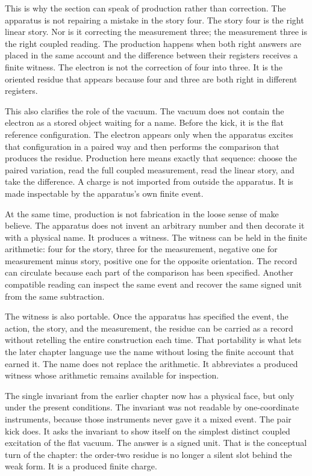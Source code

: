 This is why the section can speak of production rather than correction. The
apparatus is not repairing a mistake in the story four. The story four is the
right linear story. Nor is it correcting the measurement three; the measurement
three is the right coupled reading. The production happens when both right
answers are placed in the same account and the difference between their
registers receives a finite witness. The electron is not the correction of
four into three. It is the oriented residue that appears because four and three
are both right in different registers.

This also clarifies the role of the vacuum. The vacuum does not contain the
electron as a stored object waiting for a name. Before the kick, it is the flat
reference configuration. The electron appears only when the apparatus excites
that configuration in a paired way and then performs the comparison that
produces the residue. Production here means exactly that sequence: choose the
paired variation, read the full coupled measurement, read the linear story, and
take the difference. A charge is not imported from outside the apparatus. It is
made inspectable by the apparatus's own finite event.

At the same time, production is not fabrication in the loose sense of make
believe. The apparatus does not invent an arbitrary number and then decorate it
with a physical name. It produces a witness. The witness can be held in the
finite arithmetic: four for the story, three for the measurement, negative one
for measurement minus story, positive one for the opposite orientation. The
record can circulate because each part of the comparison has been specified.
Another compatible reading can inspect the same event and recover the same
signed unit from the same subtraction.

The witness is also portable. Once the apparatus has specified the event, the
action, the story, and the measurement, the residue can be carried as a record
without retelling the entire construction each time. That portability is what
lets the later chapter language use the name without losing the finite account
that earned it. The name does not replace the arithmetic. It abbreviates a
produced witness whose arithmetic remains available for inspection.

The single invariant from the earlier chapter now has a physical face, but only
under the present conditions. The invariant was not readable by
one-coordinate instruments, because those instruments never gave it a mixed
event. The pair kick does. It asks the invariant to show itself on the simplest
distinct coupled excitation of the flat vacuum. The answer is a signed unit.
That is the conceptual turn of the chapter: the order-two residue is no longer
a silent slot behind the weak form. It is a produced finite charge.


